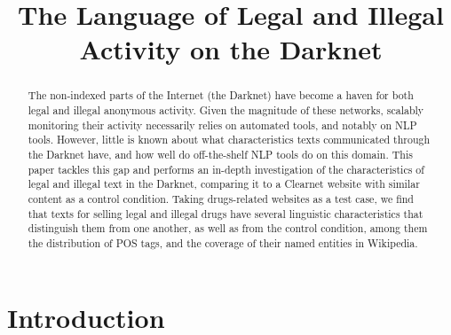 \documentclass[11pt,a4paper,table]{article}
\title{The Language of Legal and Illegal Activity on the Darknet}
\date{}
\begin{document}
\maketitle

\begin{abstract}
  The non-indexed parts of the Internet (the Darknet)
   have become a haven for both legal and illegal anonymous activity.
  Given the magnitude of these networks, scalably monitoring their activity necessarily relies
    on automated tools, and notably on NLP tools.
  However, little is known about what characteristics texts communicated through the Darknet have, 
    and how well do off-the-shelf NLP tools do on this domain.
  This paper tackles this gap and performs an in-depth investigation of the characteristics
    of legal and illegal text in the Darknet, comparing it to a Clearnet website with similar
    content as a control condition.
  Taking drugs-related websites as a test case, we find that texts for selling legal and illegal drugs
    have several linguistic characteristics that distinguish them from one another, as well as from 
    the control condition, among them the distribution of POS tags, and the coverage of their named entities in Wikipedia.
\end{abstract}



\section{Introduction}
\end{document}
